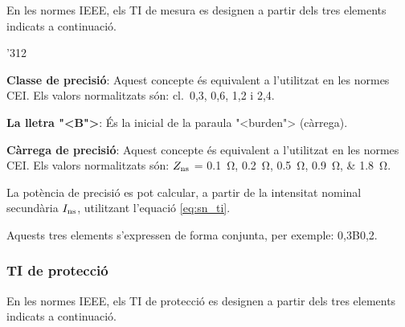 En les normes \textsf{IEEE}, els TI de mesura  es designen a partir
dels tres elements indicats a continuaci\'{o}.

\begin{dingautolist}{'312}
    \item \textbf{Classe de precisi\'{o}}: Aquest concepte \'{e}s equivalent
    a l'utilitzat en les normes \textsf{CEI}. Els valors
    normalitzats s\'{o}n: cl.~0,3, 0,6, 1,2 i 2,4.
    \item \textbf{La lletra {"<}B{">}}: \'{E}s la inicial de la paraula
    {"<}burden{">}  (c\`{a}rrega).
    \item \textbf{C\`{a}rrega de precisi\'{o}}: Aquest concepte \'{e}s equivalent
    a l'utilitzat en les normes \textsf{CEI}. Els valors
    normalitzats s\'{o}n: $Z_\mathrm{ns}$ = \SIlist{0,1;0,2;0,5;0,9;1,8}{\ohm}.

    La pot\`{e}ncia de precisi\'{o} es pot calcular, a partir de la
    intensitat nominal secund\`{a}ria $I_\mathrm{ns}$, utilitzant l'equaci\'{o}
    \eqref{eq:sn_ti}.
\end{dingautolist}

Aquests tres elements s'expressen de forma conjunta, per exemple:
0,3B0,2.

\subsubsection{TI de protecci\'{o}}

En les normes \textsf{IEEE}, els TI de protecci\'{o} es designen a
partir dels tres elements indicats a continuaci\'{o}.

